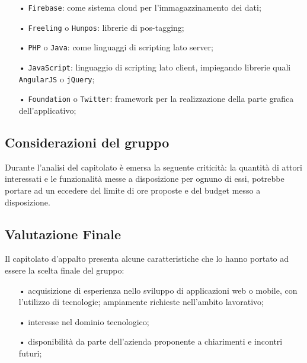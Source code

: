 \begin{itemize}
\item[•] \texttt{Firebase}: come sistema cloud per l'immagazzinamento dei dati;

\item[•] \texttt{Freeling} o \texttt{Hunpos}: librerie di pos-tagging;

\item[•] \texttt{PHP} o \texttt{Java}: come linguaggi di scripting lato server;

\item[•] \texttt{JavaScript}: linguaggio di scripting lato client, impiegando librerie quali \texttt{AngularJS} o \texttt{jQuery};

\item[•] \texttt{Foundation} o \texttt{Twitter}: framework per la realizzazione della parte grafica dell’applicativo;

\end{itemize}

\subsection{Considerazioni del gruppo}
Durante l’analisi del capitolato è emersa la seguente criticità:
la quantità di attori interessati e le funzionalità messe a disposizione per ognuno di essi, potrebbe portare ad un eccedere del limite di ore proposte e del budget messo a disposizione.

\subsection{Valutazione Finale}

Il capitolato d’appalto presenta alcune caratteristiche che lo hanno portato ad essere
la scelta finale del gruppo:
\begin{itemize}
\item[•] acquisizione di esperienza nello sviluppo di applicazioni web o mobile, con l’utilizzo di tecnologie;
ampiamente richieste nell’ambito lavorativo;
\item[•] interesse nel dominio tecnologico;
\item[•] disponibilità da parte dell'azienda proponente a chiarimenti e incontri futuri; 

\end{itemize}

